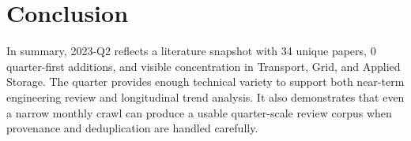 \documentclass[conference]{IEEEtran}
\begin{document}
\section{Conclusion}
In summary, 2023-Q2 reflects a literature snapshot with 34 unique papers, 0 quarter-first additions, and visible concentration in Transport, Grid, and Applied Storage. The quarter provides enough technical variety to support both near-term engineering review and longitudinal trend analysis. It also demonstrates that even a narrow monthly crawl can produce a usable quarter-scale review corpus when provenance and deduplication are handled carefully.



\end{document}
